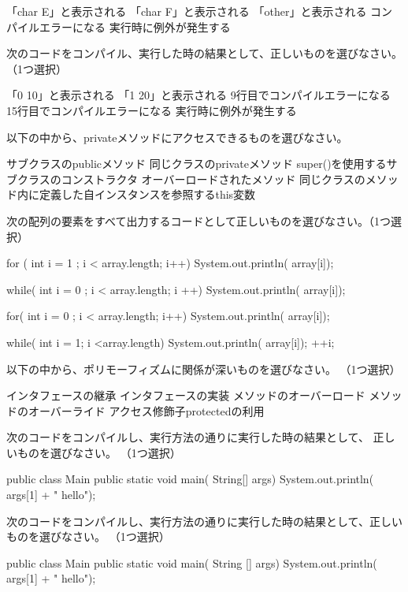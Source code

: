 \documentclass{jarticle}
\begin{document}


「char E」と表示される
「char F」と表示される
「other」と表示される
コンパイルエラーになる
実行時に例外が発生する



次のコードをコンパイル、実行した時の結果として、正しいものを選びなさい。（1つ選択）


「0 10」と表示される
「1 20」と表示される
9行目でコンパイルエラーになる
15行目でコンパイルエラーになる
実行時に例外が発生する


以下の中から、privateメソッドにアクセスできるものを選びなさい。

サブクラスのpublicメソッド
同じクラスのprivateメソッド
super()を使用するサブクラスのコンストラクタ
オーバーロードされたメソッド
同じクラスのメソッド内に定義した自インスタンスを参照するthis変数


次の配列の要素をすべて出力するコードとして正しいものを選びなさい。（1つ選択）


for ( int i = 1 ; i < array.length; i++){
    System.out.println( array[i]);
}

while( int i = 0 ; i < array.length; i ++){
    System.out.println( array[i]);
}

for( int i = 0 ; i < array.length; i++){
    System.out.println( array[i]);
}

while( int i = 1; i <array.length){
    System.out.println( array[i]);
    ++i;
}

以下の中から、ポリモーフィズムに関係が深いものを選びなさい。
（1つ選択）

インタフェースの継承
インタフェースの実装
メソッドのオーバーロード
メソッドのオーバーライド
アクセス修飾子protectedの利用

次のコードをコンパイルし、実行方法の通りに実行した時の結果として、
正しいものを選びなさい。
（1つ選択）

public  class Main{
    public static void main( String[] args){
        System.out.println( args[1] + " hello");
    }
}

次のコードをコンパイルし、実行方法の通りに実行した時の結果として、正しいものを選びなさい。
（1つ選択）

public class Main {
    public static void main( String [] args){
        System.out.println( args[1] + " hello");
    }
}
\end{document}
